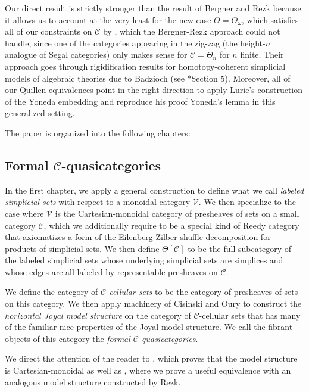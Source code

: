 \documentclass[a4paper]{article}
\numberwithin{equation}{subsection}
\theoremstyle{plain}   %
\theoremstyle{definition}
\theoremstyle{remark}
\theoremstyle{plain}
\providecommand{\C}{}
\renewcommand{\C}{\ensuremath{\mathcal{C}}}
\begin{document}
Our direct result is strictly stronger than the result of Bergner and Rezk because it allows us to account at the very least for the new case \(\Theta=\Theta_\omega\), which satisfies all of our constraints on \(\C\) by \cite{berger-iterated-wreath}, which the Bergner-Rezk approach could not handle, since one of the categories appearing in the zig-zag (the height-\(n\) analogue of Segal categories) only makes sense for \(\C=\Theta_n\) for \(n\) finite. Their approach goes through rigidification results for homotopy-coherent simplicial models of algebraic theories due to Badzioch (see \cite{bergner-rezk-2}*{Section 5}). Moreover, all of our Quillen equivalences point in the right direction to apply Lurie's construction of the Yoneda embedding and reproduce his proof Yoneda's lemma in this generalized setting.

The paper is organized into the following chapters:

\subsection*{Formal \(\C\)-quasicategories}
In the first chapter, we apply a general construction to define what we call \emph{labeled simplicial sets} with respect to a monoidal category \(\mathcal{V}\).  We then specialize to the case where \(\mathcal{V}\) is the Cartesian-monoidal category of presheaves of sets on a small category \(\C\), which we additionally require to be a special kind of Reedy category that axiomatizes a form of the Eilenberg-Zilber shuffle decomposition for products of simplicial sets.  We then define \(\Theta[\C]\) to be the full subcategory of the labeled simplicial sets whose underlying simplicial sets are simplices and whose edges are all labeled by representable presheaves on \(\C\).  

We define the category of \emph{\(\C\)-cellular sets} to be the category of presheaves of sets on this category.  We then apply machinery of Cisinski and Oury to construct the \emph{horizontal Joyal model structure} on the category of \(\C\)-cellular sets that has many of the familiar nice properties of the Joyal model structure. We call the fibrant objects of this category the \emph{formal \(\C\)-quasicategories}.

We direct the attention of the reader to , which proves that the model structure is Cartesian-monoidal as well as , where we prove a useful equivalence with an analogous model structure constructed by Rezk.    
\end{document}
